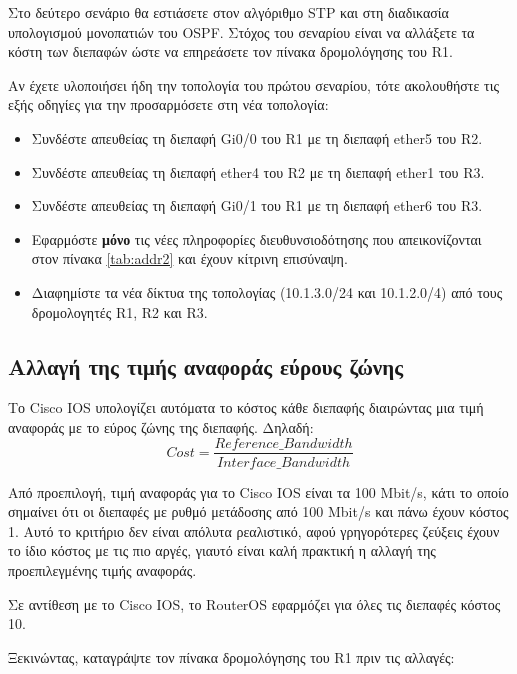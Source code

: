 \documentclass{EdipyLabs} %
\begin{document}
Στο δεύτερο σενάριο θα εστιάσετε στον αλγόριθμο STP και στη διαδικασία υπολογισμού μονοπατιών του OSPF. Στόχος του σεναρίου είναι να αλλάξετε τα κόστη των διεπαφών ώστε να επηρεάσετε τον πίνακα δρομολόγησης του R1.

Αν έχετε υλοποιήσει ήδη την τοπολογία του πρώτου σεναρίου, τότε ακολουθήστε τις εξής οδηγίες για την προσαρμόσετε στη νέα τοπολογία:
\begin{itemize}
	\item Συνδέστε απευθείας τη διεπαφή Gi0/0 του R1 με τη διεπαφή ether5 του R2.
	\item Συνδέστε απευθείας τη διεπαφή ether4 του R2 με τη διεπαφή ether1 του R3. 
	\item Συνδέστε απευθείας τη διεπαφή Gi0/1 του R1 με τη διεπαφή ether6 του R3. 
	\item Εφαρμόστε \textbf{μόνο} τις νέες πληροφορίες διευθυνσιοδότησης που απεικονίζονται στον πίνακα \ref{tab:addr2} και έχουν κίτρινη επισύναψη.
	\item Διαφημίστε τα νέα δίκτυα της τοπολογίας (10.1.3.0/24 και 10.1.2.0/4) από τους δρομολογητές R1, R2 και R3.
\end{itemize}

\subsection{Αλλαγή της τιμής αναφοράς εύρους ζώνης}

Το Cisco IOS υπολογίζει αυτόματα το κόστος κάθε διεπαφής διαιρώντας μια τιμή αναφοράς με το εύρος ζώνης της διεπαφής. Δηλαδή:%
%
$$Cost = \dfrac{Reference\_Bandwidth}{Interface\_Bandwidth}$$

Από προεπιλογή, τιμή αναφοράς για το Cisco IOS είναι τα 100 Mbit/s, κάτι το οποίο σημαίνει ότι οι διεπαφές με ρυθμό μετάδοσης από 100 Mbit/s και πάνω έχουν κόστος 1. Αυτό το κριτήριο δεν είναι απόλυτα ρεαλιστικό, αφού γρηγορότερες ζεύξεις έχουν το ίδιο κόστος με τις πιο αργές, γιαυτό είναι καλή πρακτική η αλλαγή της προεπιλεγμένης τιμής αναφοράς.

Σε αντίθεση με το Cisco IOS, το RouterOS εφαρμόζει για όλες τις διεπαφές κόστος 10. 

Ξεκινώντας, καταγράψτε τον πίνακα δρομολόγησης του R1 πριν τις αλλαγές:
\end{document}
